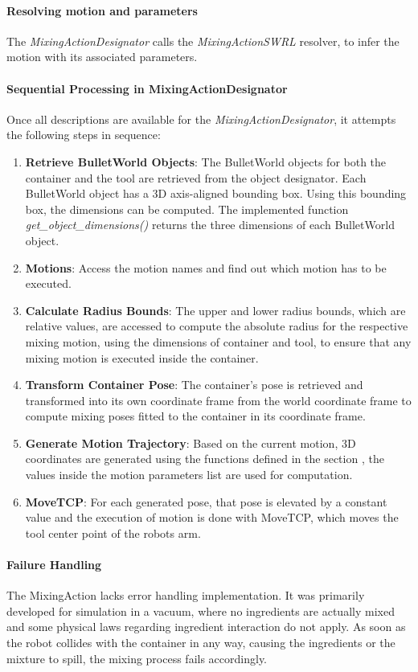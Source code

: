 \paragraph*{Resolving motion and parameters}
The \textit{MixingActionDesignator} calls the \textit{MixingActionSWRL} resolver, to infer the motion with its 
associated parameters. 

\paragraph*{Sequential Processing in MixingActionDesignator}
Once all descriptions are available for the \textit{MixingActionDesignator}, it attempts the following steps in sequence:

\begin{enumerate}
    \item \textbf{Retrieve BulletWorld Objects}: The BulletWorld objects for both the container and the tool are retrieved from the object designator. 
    Each BulletWorld object has a 3D axis-aligned bounding box. Using this bounding box, the dimensions can be computed. 
    The implemented function \textit{get\_object\_dimensions()} returns the three dimensions of each BulletWorld object.
    \item \textbf{Motions}: Access the motion names and find out which motion has to be executed.
    \item \textbf{Calculate Radius Bounds}: The upper and lower radius bounds, which are relative values, 
    are accessed to compute the absolute radius for the respective mixing motion, using the dimensions of container and tool, to ensure
    that any mixing motion is executed inside the container.
    \item \textbf{Transform Container Pose}: The container's pose is retrieved and transformed into its own coordinate frame from the world coordinate frame to 
    compute mixing poses fitted to the container in its coordinate frame.
    \item \textbf{Generate Motion Trajectory}: Based on the current motion, 3D coordinates are generated using the functions defined in the section ,
    the values inside the motion parameters list are used for computation.
    \item \textbf{MoveTCP}: For each generated pose, that pose is elevated by a constant value and the execution of motion is done with MoveTCP, which 
    moves the tool center point of the robots arm.
    
\end{enumerate}
\paragraph*{Failure Handling}
The MixingAction lacks error handling implementation. It was primarily developed for simulation in a vacuum, where no ingredients are actually mixed
and some physical laws regarding ingredient interaction do not apply. As soon as the robot collides with the container in any way, 
causing the ingredients or the mixture to spill, 
the mixing process fails accordingly. 
